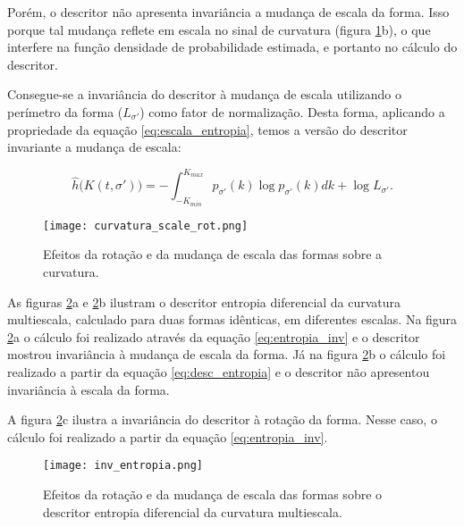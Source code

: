 Porém, o descritor não apresenta invariância a mudança de escala da forma. Isso porque tal mudança reflete em escala no sinal de curvatura (figura \ref{fig:curv_scale_rot}b), o que interfere na função densidade de probabilidade estimada, e portanto no cálculo do descritor.

Consegue-se a invariância do descritor à mudança de escala utilizando o perímetro da forma ($L_{\sigma'}$) como fator de normalização. Desta forma, aplicando a  propriedade da equação \ref{eq:escala_entropia}, temos a versão do descritor invariante a mudança de escala:

\begin{equation}\label{eq:entropia_inv}
\hat{h}\big(K(t,\sigma')\big) = -\int_{-K_{min}}^{K_{max}} p_{\sigma'}(k)\log{p_{\sigma'}(k)}dk+\log{L_{\sigma'}}\text{.}
\end{equation}

\begin{figure}[]
\caption{\label{fig:curv_scale_rot}Efeitos da rotação e da mudança de escala das formas sobre a curvatura.}
\texttt{[image: curvatura\_scale\_rot.png]}
\end{figure}

As figuras \ref{fig:entropia_inv}a e \ref{fig:entropia_inv}b ilustram o descritor entropia diferencial da curvatura multiescala, calculado para duas formas idênticas, em diferentes escalas. Na figura \ref{fig:entropia_inv}a o cálculo foi realizado através da equação \ref{eq:entropia_inv} e o descritor mostrou invariância à mudança de escala da forma. Já na figura \ref{fig:entropia_inv}b o cálculo foi realizado a partir da equação \ref{eq:desc_entropia} e o descritor não apresentou invariância à escala da forma.

A figura \ref{fig:entropia_inv}c ilustra a invariância do descritor à rotação da forma. Nesse caso, o cálculo foi realizado a partir da equação \ref{eq:entropia_inv}.

\begin{figure}[]
\caption{\label{fig:entropia_inv}Efeitos da rotação e da mudança de escala das formas sobre o descritor entropia diferencial da curvatura multiescala.}
\texttt{[image: inv\_entropia.png]}
\end{figure}

